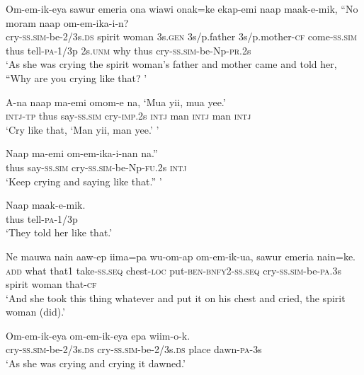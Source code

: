 {\ea\label{ex:a:x8}
\gll  Om-em-ik-eya  sawur  emeria  ona  wiawi  onak=ke                     ekap-emi  naap  maak-e-mik,  “No  moram  naap  om-em-ika-i-n? \\
cry-\textsc{ss}.\textsc{sim}-be-2/3s.\textsc{ds}  spirit  woman  3s.\textsc{gen}  3s/p.father  3s/p.mother-\textsc{cf}  come-\textsc{ss}.\textsc{sim}  thus  tell-\textsc{pa}-1/3p  2s.\textsc{unm}  why  thus  cry-\textsc{ss}.\textsc{sim}-be-Np-\textsc{pr}.2s \\


\glt ‘As she was crying the spirit woman’s father and mother came and told her, “Why are you crying like that? ’ \\
\z


\ea\label{ex:a:x9}
\gll  A-na  naap  ma-emi  omom-e  na,  ‘Mua  yii,  mua  yee.’ \\
\textsc{intj}-\textsc{tp}  thus  say-\textsc{ss}.\textsc{sim}  cry-\textsc{imp}.2s  \textsc{intj}  man  \textsc{intj}  man  \textsc{intj} \\
\glt ‘Cry like that, ‘Man yii, man yee.’ ’ \\
\z


\ea\label{ex:a:x10}
\gll  Naap  ma-emi  om-em-ika-i-nan  na.” \\
thus  say-\textsc{ss}.\textsc{sim}  cry-\textsc{ss}.\textsc{sim}-be-Np-\textsc{fu}.2s  \textsc{intj} \\
\glt ‘Keep crying and saying like that.” ’ \\
\z


\ea\label{ex:a:x11}
\gll  Naap  maak-e-mik. \\
thus  tell-\textsc{pa}-1/3p \\
\glt ‘They told her like that.’ \\
\z


\ea\label{ex:a:x12}
\gll  Ne  mauwa  nain  aaw-ep  iima=pa  wu-om-ap                 om-em-ik-ua,  sawur  emeria  nain=ke. \\
\textsc{add}  what  that1  take-\textsc{ss.seq}  chest-\textsc{loc}  put-\textsc{ben}-\textsc{bnfy}2-\textsc{ss.seq}   cry-\textsc{ss}.\textsc{sim}-be-\textsc{pa}.3s  spirit  woman  that-\textsc{cf} \\


\glt ‘And she took this thing whatever and put it on his chest and cried, the spirit woman (did).’ \\
\z


\ea\label{ex:a:x13}
\gll  Om-em-ik-eya  om-em-ik-eya  epa  wiim-o-k. \\
cry-\textsc{ss}.\textsc{sim}-be-2/3s.\textsc{ds}  cry-\textsc{ss}.\textsc{sim}-be-2/3s.\textsc{ds}  place  dawn-\textsc{pa}-3s \\
\glt ‘As she was crying and crying it dawned.’ \\
\z


}
